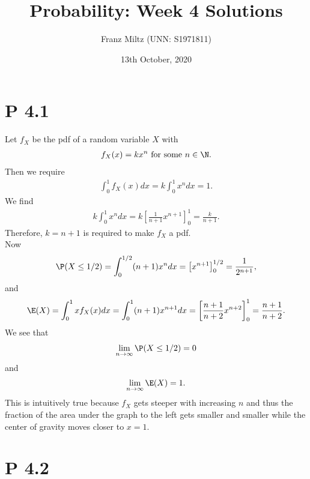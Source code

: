 \documentclass{article}
\begin{document}
\title{Probability: Week 4 Solutions}
\author{Franz Miltz (UNN: S1971811)}
\date{13th October, 2020}
\maketitle


\section*{P 4.1} 


Let $f_X$ be the pdf of a random variable $X$ with
\begin{align*}
  f_X(x) = k x^n \text{ for some } n\in\N.
\end{align*}
Then we require
\begin{align*}
  \int_0^1 f_X(x) dx = k\int_0^1 x^n dx = 1.
\end{align*}
We find
\begin{align*}
   k\int_0^1 x^n dx = k\left[\frac{1}{n+1}x^{n+1}\right]_0^1 = \frac{k}{n+1}.
\end{align*}
Therefore, $k=n+1$ is required to make $f_X$ a pdf.\\
Now 
\begin{align*}
  \P(X\leq 1/2) = \int_0^{1/2} (n+1)x^n dx = \left[x^{n+1}\right]_0^{1/2} 
  =\frac{1}{2^{n+1}},
\end{align*}
and
\begin{align*}
  \E(X) = \int_0^1 x f_X(x) dx = \int_0^1 (n+1)x^{n+1} dx
  = \left[\frac{n+1}{n+2}x^{n+2}\right]_0^1 = \frac{n+1}{n+2}.
\end{align*}
We see that 
\begin{align*}
  \lim_{n\to\infty} \P(X\leq 1/2) = 0
\end{align*}
and
\begin{align*}
  \lim_{n\to\infty} \E(X) = 1.
\end{align*}
This is intuitively true because $f_X$ gets steeper with increasing
$n$ and thus the fraction of the area under the graph to the left 
gets smaller and smaller while the center of gravity moves closer to
$x=1$.


\section*{P 4.2}
\end{document}
